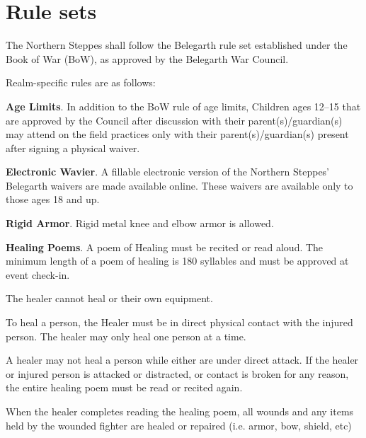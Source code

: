 \documentclass[12pt]{article}
\begin{document}
\section{Rule sets}
\begin{level}
    \item The Northern Steppes shall follow the Belegarth rule set established under the Book of War (BoW), as approved by the Belegarth War Council.
    \item Realm-specific rules are as follows:
    \begin{level}
        \item \textbf{Age Limits}. In addition to the BoW rule of age limits, Children ages 12--15 that are approved by the Council after discussion with their parent(s)/guardian(s) may attend on the field practices only with their parent(s)/guardian(s) present after signing a physical waiver.
        \item \textbf{Electronic Wavier}. A fillable electronic version of the Northern Steppes' Belegarth waivers are made available online. These waivers are available only to those ages 18 and up.
        \item \textbf{Rigid Armor}. Rigid metal knee and elbow armor is allowed.
        \item \textbf{Healing Poems}. A poem of Healing must be recited or read aloud. The minimum length of a poem of healing is 180 syllables and must be approved at event check-in.
        \begin{level}
            \item The healer cannot heal  or their own equipment.
            \item To heal a person, the Healer must be in direct physical contact with the injured person. The healer may only heal one person at a time.
            \item A healer may not heal a person while either are under direct attack. If the healer or injured person is attacked or distracted, or contact is broken for any reason, the entire healing poem must be read or recited again.
            \item When the healer completes reading the healing poem, all wounds and any items held by the wounded fighter are healed or repaired (i.e. armor, bow, shield, etc)
        \end{level}
    \end{level}
\end{level}
\end{document}
